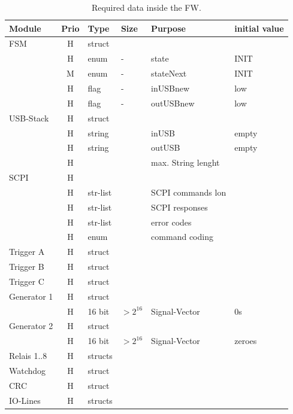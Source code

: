 	\begin{table}[ht!]
	\centering
	\begin{tabular}{|l|c|l|l|l|l|}
	\hline
	\redrow Module	& Prio & Type	& Size 	& Purpose		& initial value \\ \hline
	FSM			& H	& struct	& 			& 					& 		\\ \hline
				& H	& enum		& -			& state				& INIT	\\ \hline
				& M	& enum		& -			& stateNext			& INIT	\\ \hline
				& H	& flag		& -			& inUSBnew			& low	\\ \hline
				& H	& flag		& -			& outUSBnew			& low	\\ \hline
	USB-Stack	& H	& struct	& 			& 					& 		\\ \hline
				& H	& string	& 			& inUSB				& empty	\\ \hline
				& H	& string	& 			& outUSB			& empty	\\ \hline
				& H	& 			& 			& max. String lenght		& 		\\ \hline
	SCPI		& H	& 			& 			& 					& 		\\ \hline
				& H	& str-list	& 			& SCPI commands	lon & 		\\ \hline
				& H	& str-list	& 			& SCPI responses	& 		\\ \hline
				& H	& str-list	& 			& error codes		& 		\\ \hline
				& H	& enum		& 			& command coding	& 		\\ \hline
	Trigger A	& H	& struct	& 			& 					& 		\\ \hline
	Trigger B	& H	& struct	& 			& 					& 		\\ \hline
	Trigger C	& H	& struct	& 			& 					& 		\\ \hline
	Generator 1	& H	& struct	& 			& 					& 		\\ \hline
				& H	& 16 bit	& $>2^{16}$	& Signal-Vector		& 0s	\\ \hline
	Generator 2	& H	& struct	& 			&					& 		\\ \hline
				& H	& 16 bit	& $>2^{16}$	& Signal-Vector		& zeroes\\ \hline
	Relais 1..8	& H	& structs	& 			& 					& 		\\ \hline
	Watchdog	& H	& struct	& 			& 					& 		\\ \hline
	CRC			& H	& struct	& 			& 					& 		\\ \hline
	IO-Lines	& H	& structs	& 			& 					& 		\\ \hline
			\end{tabular}
		\caption{Required data inside the FW.}
	\label{tab:Vars}
	\end{table}
	

